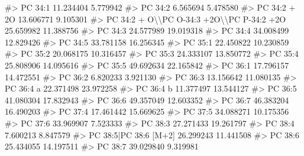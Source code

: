 \documentclass[
  letterpaper,
  DIV=11,
  numbers=noendperiod]{scrreprt}
\newenvironment{Shaded}{\begin{snugshade}}{\end{snugshade}}
\newcommand{\CommentTok}[1]{\textcolor[rgb]{0.37,0.37,0.37}{#1}}
\begin{document}
\begin{Shaded}
\begin{Highlighting}[]
\CommentTok{\#\textgreater{} PC 34:1                                   11.234404  5.779942}
\CommentTok{\#\textgreater{} PC 34:2                                    6.565694  5.478580}
\CommentTok{\#\textgreater{} PC 34:2 + 2O                              13.606771  9.105301}
\CommentTok{\#\textgreater{} PC 34:2 + O\textbackslash{}\textbackslash{}PC O{-}34:3 +2O\textbackslash{}\textbackslash{}PC P{-}34:2 +2O 25.659982 11.388756}
\CommentTok{\#\textgreater{} PC 34:3                                   24.577989 19.019318}
\CommentTok{\#\textgreater{} PC 34:4                                   34.008499 12.829426}
\CommentTok{\#\textgreater{} PC 34:5                                   33.781158 16.256345}
\CommentTok{\#\textgreater{} PC 35:1                                   22.450822 10.230859}
\CommentTok{\#\textgreater{} PC 35:2                                   20.068175 10.316457}
\CommentTok{\#\textgreater{} PC 35:3                                   24.333107 13.850772}
\CommentTok{\#\textgreater{} PC 35:4                                   25.808906 14.095616}
\CommentTok{\#\textgreater{} PC 35:5                                   49.692634 22.165842}
\CommentTok{\#\textgreater{} PC 36:1                                   17.796157 14.472551}
\CommentTok{\#\textgreater{} PC 36:2                                    6.820233  3.921130}
\CommentTok{\#\textgreater{} PC 36:3                                   13.156642 11.080135}
\CommentTok{\#\textgreater{} PC 36:4 a                                 22.371498 23.972258}
\CommentTok{\#\textgreater{} PC 36:4 b                                 11.377497 13.544127}
\CommentTok{\#\textgreater{} PC 36:5                                   41.080304 17.832943}
\CommentTok{\#\textgreater{} PC 36:6                                   49.357049 12.603352}
\CommentTok{\#\textgreater{} PC 36:7                                   46.383204 16.490203}
\CommentTok{\#\textgreater{} PC 37:4                                   17.461442 15.669625}
\CommentTok{\#\textgreater{} PC 37:5                                   34.088271 10.175356}
\CommentTok{\#\textgreater{} PC 37:6                                   33.969907  7.523333}
\CommentTok{\#\textgreater{} PC 38:3                                   27.271433 19.261797}
\CommentTok{\#\textgreater{} PC 38:4                                    7.600213  8.847579}
\CommentTok{\#\textgreater{} PC 38:5|PC 38:6 [M+2]                     26.299243 11.441508}
\CommentTok{\#\textgreater{} PC 38:6                                   25.434055 14.197511}
\CommentTok{\#\textgreater{} PC 38:7                                   39.029840  9.319981}

\end{Highlighting}
\end{Shaded}
\end{document}
